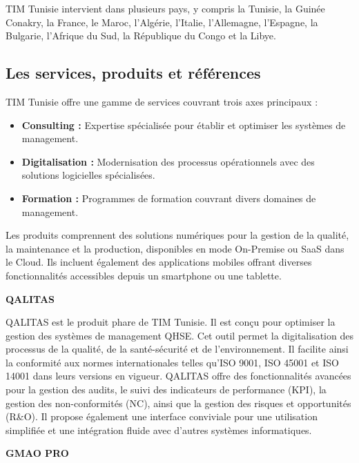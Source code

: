 TIM Tunisie intervient dans plusieurs pays, y compris la Tunisie, la Guinée Conakry, la France, le Maroc, l'Algérie, l'Italie, l'Allemagne, l'Espagne, la Bulgarie, l'Afrique du Sud, la République du Congo et la Libye.

\subsection{Les services, produits et références}

TIM Tunisie offre une gamme de services couvrant trois axes principaux :

\begin{itemize}
    \item \textbf{Consulting :} Expertise spécialisée pour établir et optimiser les systèmes de management.
    \item \textbf{Digitalisation :} Modernisation des processus opérationnels avec des solutions logicielles spécialisées.
    \item \textbf{Formation :} Programmes de formation couvrant divers domaines de management.
\end{itemize}

Les produits comprennent des solutions numériques pour la gestion de la qualité, la maintenance et la production, disponibles en mode On-Premise ou SaaS dans le Cloud. Ils incluent également des applications mobiles offrant diverses fonctionnalités accessibles depuis un smartphone ou une tablette.

\vspace{0.5em}
\noindent\textbf{QALITAS}

QALITAS est le produit phare de TIM Tunisie. Il est conçu pour optimiser la gestion des systèmes de management QHSE. Cet outil permet la digitalisation des processus de la qualité, de la santé-sécurité et de l'environnement. Il facilite ainsi la conformité aux normes internationales telles qu'ISO 9001, ISO 45001 et ISO 14001 dans leurs versions en vigueur. QALITAS offre des fonctionnalités avancées pour la gestion des audits, le suivi des indicateurs de performance (KPI), la gestion des non-conformités (NC), ainsi que la gestion des risques et opportunités (R\&O). Il propose également une interface conviviale pour une utilisation simplifiée et une intégration fluide avec d'autres systèmes informatiques.

\vspace{0.5em}
\noindent\textbf{GMAO PRO}

